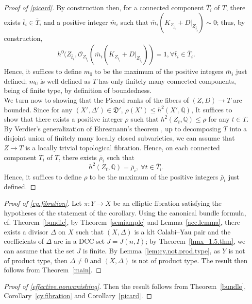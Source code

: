 \documentclass{amsart}[12pt,a4paper]
\theoremstyle{definition}
\begin{document}
\begin{proof}[Proof of \ref{picard}]
By construction then, for a connected component $\overline{T}_i$ of $T$, there exists $\bar{t}_i \in \overline{T}_i$ and a positive integer $\bar{m}_i$ such that $\bar{m}_i(K_{Z_{\bar{t}_i}} + D\vert_{Z_{\bar{t}_i}}) \sim 0$;
thus, by construction, 
\begin{align}
\label{inv.plurig.cy.eqn}
h^0(Z_{\bar{t}_i}, \mathcal{O}_{Z_{\bar{t}_i}}(\bar{m}_i(K_{Z_{\bar{t}_i}} + D\vert_{Z_{\bar{t}_i}}))=1, \forall \bar{t}_i \in \overline{T}_i.
\end{align} 
Hence, it suffices to define $m_0$ to be the maximum of the positive integers $\bar{m}_i$ just defined; 
$m_0$ is well defined as $T$ has only finitely many connected components, being of finite type, by definition of boundedness.
\\
We turn now to showing that the Picard ranks of the fibers of $(Z, D) \to T$ are bounded.
Since for any $(X', \Delta') \in \mathfrak{D}'$, $\rho(X') \leq h^2(X', \mathbb{Q})$,
It suffices to show that there exists a positive integer $\rho$ such that $h^2(Z_t, \mathbb{Q}) \leq \rho$ for any $t \in T$.
By Verdier's generalization of Ehresmann's theorem \cite[Corollaire~5.1]{Ver}, up to decomposing $T$ into a disjoint union of finitely many locally closed subvarieties, we can assume that $Z \to T$ is a locally trivial topological fibration. 
Hence, on each connected component $\overline{T}_i$ of $T$, there exists $\bar{\rho}_i$ such that 
\[
h^2(Z_t, \mathbb{Q})=\bar{\rho}_i, \ \forall t \in \overline{T}_i.
\] 
Hence, it suffices to define $\rho$ to be the maximum of the positive integers $\bar{\rho}_i$ just defined.
\end{proof}

\begin{proof}[Proof of \ref{cy.fibration}]
Let $\pi \colon Y \rightarrow X$ be an elliptic fibration satisfying the hypotheses of the statement of the corollary.
Using the canonical bundle formula, cf. Theorem~\ref{bundle}, 
by Theorem~\ref{semiample} and Lemma~\ref{acc.lemma}, there exists a divisor $\Delta$ on $X$ such that $(X, \Delta)$ is a klt Calabi--Yau pair and the coefficients of $\Delta$ are in a DCC set $J=J(n, I)$; 
by Theorem~\ref{hmx_1.5.thm}, we can assume that the set $J$ is finite.
By Lemma~\ref{lem:cy.not.prod.type}, as $Y$ is not of product type, then $\Delta \neq 0$ and $(X, \Delta)$ is not of product type.
The result then follows from Theorem~\ref{main}.
\end{proof}

\begin{proof}[Proof of \ref{effective.nonvanishing}]
Then the result follows from Theorem~\ref{bundle}, Corollary~\ref{cy.fibration} and Corollary~\ref{picard}.
\end{proof}
\end{document}
